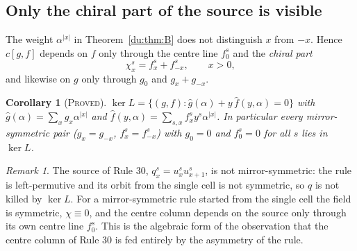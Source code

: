 \documentclass[11pt]{article}
\newtheorem{corollary}[theorem]{Corollary}
\theoremstyle{definition}
\theoremstyle{remark}
\newtheorem{remark}[theorem]{Remark}
\newcommand{\PROVED}{\textsc{Proved}}
\begin{document}
\subsection{Only the chiral part of the source is visible}

The weight $\alpha^{|x|}$ in Theorem~\ref{du:thm:B} does not distinguish $x$ from $-x$.
Hence $c[g,f]$ depends on $f$ only through the centre line $f^s_0$ and the
\emph{chiral part}
\[
  \chi^s_x = f^s_x + f^s_{-x}, \qquad x>0 ,
\]
and likewise on $g$ only through $g_0$ and $g_x+g_{-x}$.

\begin{corollary}[\PROVED]\label{du:cor:C}
$\ker L = \{(g,f) : \hat g(\alpha) + y\,\hat f(y,\alpha) = 0\}$ with
$\hat g(\alpha)=\sum_x g_x\alpha^{|x|}$ and $\hat f(y,\alpha)=\sum_{s,x}f^s_x y^s\alpha^{|x|}$.
In particular every mirror-symmetric pair ($g_x=g_{-x}$, $f^s_x=f^s_{-x}$) with
$g_0=0$ and $f^s_0=0$ for all $s$ lies in $\ker L$.
\end{corollary}

\begin{remark}
The source of Rule 30, $q^s_x=u^s_x u^s_{x+1}$, is not mirror-symmetric: the rule
is left-permutive and its orbit from the single cell is not symmetric, so $q$ is not
killed by $\ker L$. For a mirror-symmetric rule started from the single cell the
field is symmetric, $\chi\equiv 0$, and the centre column depends on the source only
through its own centre line $f^s_0$. This is the algebraic form of the observation
that the centre column of Rule 30 is fed entirely by the asymmetry of the rule.
\end{remark}
\end{document}
